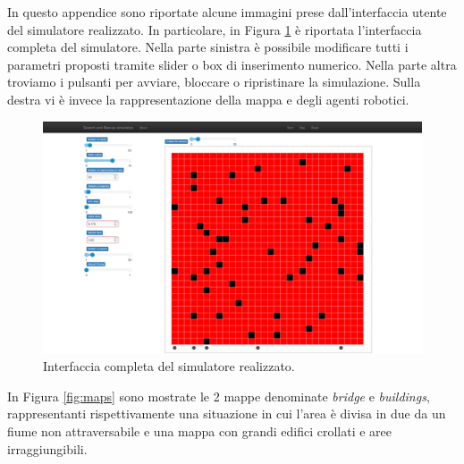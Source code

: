 In questo appendice sono riportate alcune immagini prese dall'interfaccia utente del simulatore realizzato. In particolare, in Figura \ref{fig:interface} è riportata l'interfaccia completa del simulatore. Nella parte sinistra è possibile modificare tutti i parametri proposti tramite slider o box di inserimento numerico. Nella parte altra troviamo i pulsanti per avviare, bloccare o ripristinare la simulazione. Sulla destra vi è invece la rappresentazione della mappa e degli agenti robotici.
\begin{figure}
	\centering
	\includegraphics[width=1.2\linewidth]{images/interface}
	\caption{Interfaccia completa del simulatore realizzato.}
	\label{fig:interface}
\end{figure}
In Figura \ref{fig:maps} sono mostrate le 2 mappe denominate \textit{bridge} e \textit{buildings}, rappresentanti rispettivamente una situazione in cui l'area è divisa in due da un fiume non attraversabile e una mappa con grandi edifici crollati e aree irraggiungibili.
